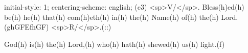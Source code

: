 initial-style: 1;
centering-scheme: english;
(c3) <sp>V/</sp>. Bless(h)ed(h) be(h) he(h) that(h) com(h)eth(h) in(h) the(h) Name(h) of(h) the(h) Lord.(ghGFEfhGF) <sp>R/</sp>.(::)

God(h) is(h) the(h) Lord,(h) who(h) hath(h) shewed(h) us(h) light.(f)
